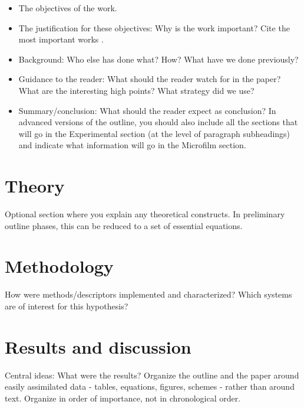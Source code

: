 \documentclass[twoside,twocolumn,9pt]{article}
\begin{document}
\begin{itemize}
    \item The objectives of the work. 
    \item The justification for these objectives: Why is the work important? Cite the most important works \cite{whitesides2004a}.
    \item Background: Who else has done what? How? What have we done previously?
    \item Guidance to the reader: What should the reader watch for in the paper? What are the interesting high points? What strategy did we use?
    \item Summary/conclusion: What should the reader expect as conclusion? In advanced versions of the outline, you should also include all the sections that will go in the Experimental section (at the level of paragraph subheadings) and indicate what information will go in the Microfilm section.
\end{itemize}

\section{Theory}

Optional section where you explain any theoretical constructs. In preliminary outline phases, this can be reduced to a set of essential equations.

\section{Methodology}

How were methods/descriptors implemented and characterized? Which systems are of interest for this hypothesis?

\section{Results and discussion}

Central ideas: What were the results? Organize the outline and the paper around easily assimilated data - tables, equations, figures, schemes - rather than around text. Organize in order of importance, not in chronological order.
\end{document}

